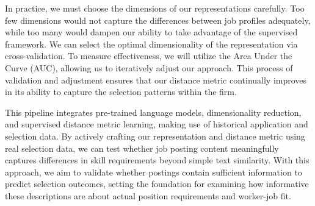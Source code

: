 In practice, we must choose the dimensions of our representations carefully. Too few dimensions would not capture the differences between job profiles adequately, while too many would dampen our ability to take advantage of the supervised framework. We can select the optimal dimensionality of the representation via cross-validation. To measure effectiveness, we will utilize the Area Under the Curve (AUC), allowing us to iteratively adjust our approach. This process of validation and adjustment ensures that our distance metric continually improves in its ability to capture the selection patterns within the firm.


This pipeline integrates pre-trained language models, dimensionality reduction, and supervised distance metric learning, making use of historical application and selection data. By actively crafting our representation and distance metric using real selection data, we can test whether job posting content meaningfully captures differences in skill requirements beyond simple text similarity. With this approach, we aim to validate whether postings contain sufficient information to predict selection outcomes, setting the foundation for examining how informative these descriptions are about actual position requirements and worker-job fit.

